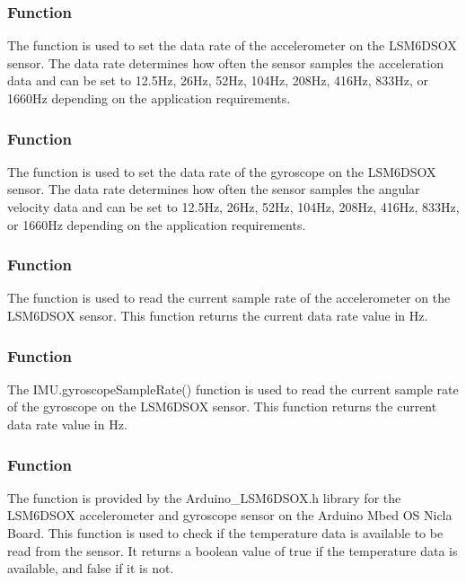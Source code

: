 \subsubsection{Function }

The  function is used to set the data rate of the accelerometer on the LSM6DSOX sensor. The data rate determines how often the sensor samples the acceleration data and can be set to 12.5Hz, 26Hz, 52Hz, 104Hz, 208Hz, 416Hz, 833Hz, or 1660Hz depending on the application requirements.

\subsubsection{Function }

The  function is used to set the data rate of the gyroscope on the LSM6DSOX sensor. The data rate determines how often the sensor samples the angular velocity data and can be set to 12.5Hz, 26Hz, 52Hz, 104Hz, 208Hz, 416Hz, 833Hz, or 1660Hz depending on the application requirements.

\subsubsection{Function }

The function is used to read the current sample rate of the accelerometer on the LSM6DSOX sensor. This function returns the current data rate value in Hz.

\subsubsection{Function }

The IMU.gyroscopeSampleRate() function is used to read the current sample rate of the gyroscope on the LSM6DSOX sensor. This function returns the current data rate value in Hz.

\subsubsection{Function }

The function is provided by the Arduino\_LSM6DSOX.h library for the LSM6DSOX accelerometer and gyroscope sensor on the Arduino Mbed OS Nicla Board. This function is used to check if the temperature data is available to be read from the sensor. It returns a boolean value of true if the temperature data is available, and false if it is not.

